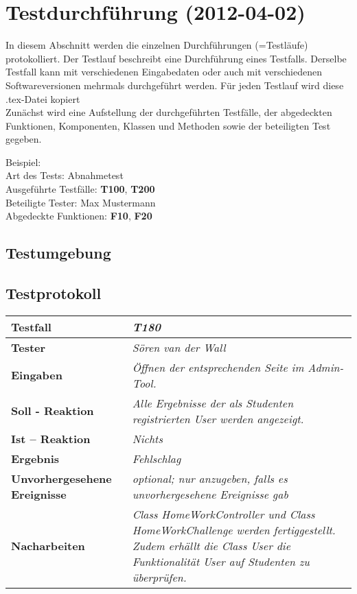 
\chapter{Testdurchführung (2012-04-02)}

In diesem Abschnitt werden die einzelnen Durchführungen (=Testläufe) protokolliert.
Der Testlauf beschreibt eine Durchführung eines Testfalls. Derselbe
Testfall kann mit verschiedenen Eingabedaten oder auch mit verschiedenen
Softwareversionen mehrmals durchgeführt werden. Für jeden Testlauf wird diese .tex-Datei kopiert\\

Zunächst wird eine Aufstellung der durchgeführten Testfälle, der abgedeckten Funktionen, Komponenten, Klassen und Methoden sowie der beteiligten Test gegeben.

Beispiel:\\
Art des Tests: Abnahmetest\\
Ausgeführte Testfälle: \textbf{T100}, \textbf{T200}\\ 
Beteiligte Tester: Max Mustermann\\
Abgedeckte Funktionen: \textbf{F10}, \textbf{F20}

\section{Testumgebung}



\section{Testprotokoll}

\begin{longtable}{|p{4cm}|p{11cm}|}
\hline
\textbf{Testfall} & \textit{\textbf{T180}} \\
\hline
\textbf{Tester} & \textit{Sören van der Wall} \\
\hline
\textbf{Eingaben} & \textit{Öffnen der entsprechenden Seite im Admin-Tool.} \\
\hline
\textbf{Soll - Reaktion} & \textit{Alle Ergebnisse der als Studenten registrierten User werden angezeigt.
} \\
\hline
\textbf{Ist -- Reaktion} & \textit{Nichts} \\
\hline
\textbf{Ergebnis} & \textit{Fehlschlag} \\
\hline
\textbf{Unvorhergesehene Ereignisse} &
\textit{optional; nur anzugeben, falls es unvorhergesehene Ereignisse gab} \\
\hline
\textbf{Nacharbeiten } & \textit{Class HomeWorkController und Class HomeWorkChallenge werden fertiggestellt. Zudem erhällt die Class User die Funktionalität User auf Studenten zu überprüfen.} \\
\hline
\end{longtable}

